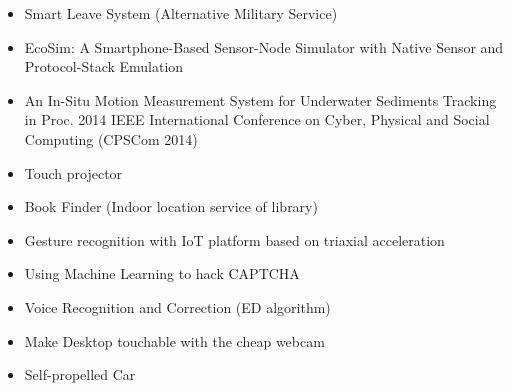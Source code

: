 \documentclass{res}
\begin{document}
\begin{resume}
\begin{itemize}[leftmargin=*]
					\item Smart Leave System (Alternative Military Service) 
					\vspace{-0.05in}
					
					\item EcoSim: A Smartphone-Based Sensor-Node Simulator with Native Sensor and Protocol-Stack Emulation
					\vspace{-0.05in}
					
					\item An In-Situ Motion Measurement System for Underwater Sediments Tracking {\footnotesize in Proc. 2014 IEEE International Conference on Cyber, Physical and Social Computing (CPSCom 2014)}
					\vspace{-0.05in}

					\item Touch projector
					\vspace{-0.05in}
					
					\item Book Finder (Indoor location service of library)
					\vspace{-0.05in}
					
					\item Gesture recognition with IoT platform based on triaxial acceleration
					\vspace{-0.05in}
					
					\item Using Machine Learning to hack CAPTCHA	
					\vspace{-0.05in}
					
					\item Voice Recognition and Correction (ED algorithm)
					\vspace{-0.05in}

					\item Make Desktop touchable with the cheap webcam
					\vspace{-0.05in}

					\item Self-propelled Car
					\vspace{-0.05in}

					
					


			\end{itemize}
			
				          
		\end{resume}
	
\end{document}
